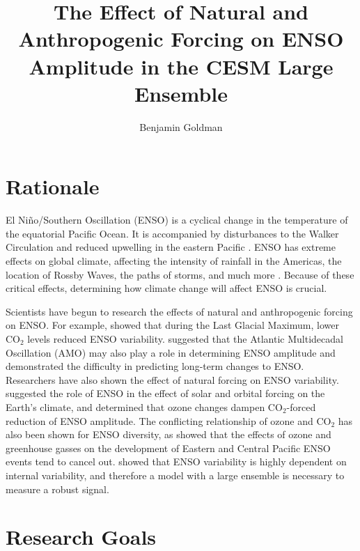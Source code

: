 \documentclass{article}
\title{The Effect of Natural and Anthropogenic Forcing on ENSO Amplitude in the CESM Large Ensemble}
\author{Benjamin Goldman}
\begin{document}
\maketitle

\section{Rationale}

El Ni\~{n}o/Southern Oscillation (ENSO) is a cyclical change in the temperature of the equatorial Pacific Ocean. It is accompanied by disturbances to the Walker Circulation and reduced upwelling in the eastern Pacific \citep{bjerknes1969atmospheric}. ENSO has extreme effects on global climate, affecting the intensity of rainfall in the Americas, the location of Rossby Waves, the paths of storms, and much more \citep{liu2007atmospheric}. Because of these critical effects, determining how climate change will affect ENSO is crucial.

Scientists have begun to research the effects of natural and anthropogenic forcing on ENSO. For example, \citet{zhu2017reduced} showed that during the Last Glacial Maximum, lower CO$_{2}$ levels reduced ENSO variability. \citet{levine2017impact} suggested that the Atlantic Multidecadal Oscillation (AMO) may also play a role in determining ENSO amplitude and demonstrated the difficulty in predicting long-term changes to ENSO. Researchers have also shown the effect of natural forcing on ENSO variability. \citet{emile2007nino} suggested the role of ENSO in the effect of solar and orbital forcing on the Earth's climate, and \citet{liu2007atmospheric} determined that ozone changes dampen CO$_{2}$-forced reduction of ENSO amplitude. The conflicting relationship of ozone and CO$_{2}$ has also been shown for ENSO diversity, as \citet{stevenson2019forced} showed that the effects of ozone and greenhouse gasses on the development of Eastern and Central Pacific ENSO events tend to cancel out. \citet{zheng2018response} showed that ENSO variability is highly dependent on internal variability, and therefore a model with a large ensemble is necessary to measure a robust signal.

\section{Research Goals}
\end{document}
